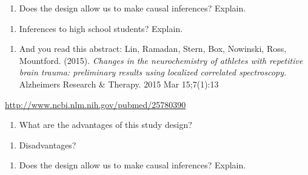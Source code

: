 \documentclass[
]{report}
\providecommand{\tightlist}{%
  \setlength{\itemsep}{0pt}\setlength{\parskip}{0pt}}
\begin{document}
\vspace{0.5in}

\begin{enumerate}
\def\labelenumi{\alph{enumi})}
\setcounter{enumi}{2}
\tightlist
\item
  Does the design allow us to make causal inferences? Explain.
\end{enumerate}

\vspace{0.5in}

\begin{enumerate}
\def\labelenumi{\alph{enumi})}
\setcounter{enumi}{3}
\tightlist
\item
  Inferences to high school students? Explain.
\end{enumerate}

\vspace{0.5in}

\begin{enumerate}
\def\labelenumi{\arabic{enumi}.}
\setcounter{enumi}{3}
\tightlist
\item
  And you read this abstract:
  Lin, Ramadan, Stern, Box, Nowinski, Ross, Mountford. (2015). \emph{Changes in the neurochemistry of athletes with repetitive brain trauma: preliminary results using localized correlated spectroscopy.} Alzheimers Research \& Therapy.
  2015 Mar 15;7(1):13
\end{enumerate}

\url{http://www.ncbi.nlm.nih.gov/pubmed/25780390}

\begin{enumerate}
\def\labelenumi{\alph{enumi})}
\tightlist
\item
  What are the advantages of this study design?
\end{enumerate}

\vspace{0.5in}

\begin{enumerate}
\def\labelenumi{\alph{enumi})}
\setcounter{enumi}{1}
\tightlist
\item
  Disadvantages?
\end{enumerate}

\vspace{0.5in}

\begin{enumerate}
\def\labelenumi{\alph{enumi})}
\setcounter{enumi}{2}
\tightlist
\item
  Does the design allow us to make causal inferences? Explain.
\end{enumerate}
\end{document}
